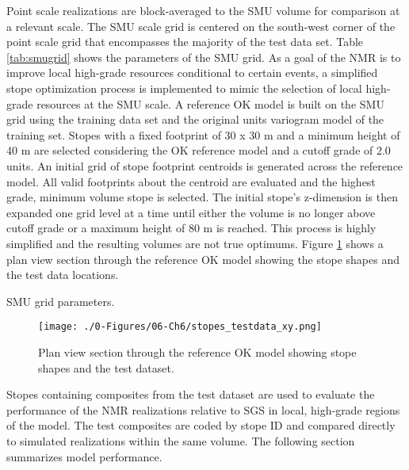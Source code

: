 Point scale realizations are block-averaged to the \gls{SMU} volume for comparison at a relevant scale. The \gls{SMU} scale grid is centered on the south-west corner of the point scale grid that encompasses the majority of the test data set. Table \ref{tab:smugrid} shows the parameters of the \gls{SMU} grid. As a goal of the \gls{NMR} is to improve local high-grade resources conditional to certain events, a simplified stope optimization process is implemented to mimic the selection of local high-grade resources at the \gls{SMU} scale. A reference \gls{OK} model is built on the \gls{SMU} grid using the training data set and the original units variogram model of the training set. Stopes with a fixed footprint of 30 x 30 m and a minimum height of 40 m are selected considering the \gls{OK} reference model and a cutoff grade of 2.0 units. An initial grid of stope footprint centroids is generated across the reference model. All valid footprints about the centroid are evaluated and the highest grade, minimum volume stope is selected. The initial stope's z-dimension is then expanded one grid level at a time until either the volume is no longer above cutoff grade or a maximum height of 80 m is reached. This process is highly simplified and the resulting volumes are not true optimums. Figure \ref{fig:stopes_testdata_xy} shows a plan view section through the reference \gls{OK} model showing the stope shapes and the test data locations.

\begin{table}[!htb]
    \centering
    \caption{\Gls{SMU} grid parameters.}
    \resizebox{0.9\width}{!}{}
    \label{tab:smugrid}
\end{table}

\begin{figure}[htb!]
    \centering
    \texttt{[image: ./0-Figures/06-Ch6/stopes\_testdata\_xy.png]}
    \caption{Plan view section through the reference \gls{OK} model showing stope shapes and the test dataset. }
    \label{fig:stopes_testdata_xy}
\end{figure}

Stopes containing composites from the test dataset are used to evaluate the performance of the \gls{NMR} realizations relative to \gls{SGS} in local, high-grade regions of the model. The test composites are coded by stope ID and compared directly to simulated realizations within the same volume. The following section summarizes model performance.

